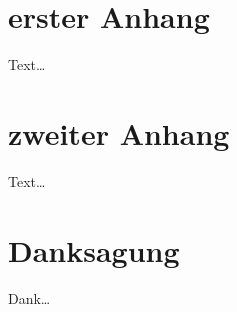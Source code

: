 \documentclass[bachelor,       %
               twoside,        %
               BCOR10mm,       %
               ngerman,english  %
               ]{GAUBM}
\begin{document}
\appendix
\chapter{erster Anhang}
Text\dots
\chapter{zweiter Anhang}
Text\dots

\cleardoublepage
 

\chapter*{Danksagung}
Dank\dots

\Declaration
\end{document}
